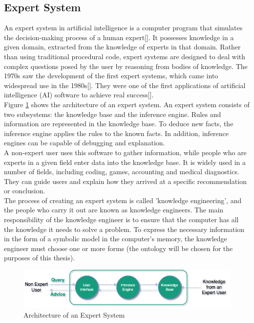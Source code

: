\subsection{Expert System\label{subsec:exp-sys}}
An expert system in artificial intelligence is a computer program that simulates the decision-making process of a human expert[]. It possesses knowledge in a given domain, extracted from the knowledge of experts in that domain.  Rather than using traditional procedural code, expert systems are designed to deal with complex questions posed by the user by reasoning from bodies of knowledge. The 1970s saw the development of the first expert systems, which came into widespread use in the 1980s[]. They were one of the first applications of artificial intelligence (AI) software to achieve real success[]. \\

Figure \ref{fig:es-archi} shows the architecture of an expert system. An expert system consists of two subsystems: the knowledge base and the inference engine. Rules and information are represented in the knowledge base. To deduce new facts, the inference engine applies the rules to the known facts. In addition, inference engines can be capable of debugging and explanation.\\

A non-expert user uses this software to gather information, while people who are experts in a given field enter data into the knowledge base. It is widely used in a number of fields, including coding, games, accounting and medical diagnostics. They can guide users and explain how they arrived at a specific recommendation or conclusion.\\

The process of creating an expert system is called 'knowledge engineering', and the people who carry it out are known as knowledge engineers. The main responsibility of the knowledge engineer is to ensure that the computer has all the knowledge it needs to solve a problem. To express the necessary information in the form of a symbolic model in the computer's memory, the knowledge engineer must choose one or more forms (the ontology will be chosen for the purposes of this thesis).\\

\begin{figure}[h]
    \centering
    \includegraphics[scale=0.6]{images/Foundation-Architecture_Expert_System.drawio.png}
    \caption{\label{fig:es-archi} Architecture of an Expert System }
\end{figure}

